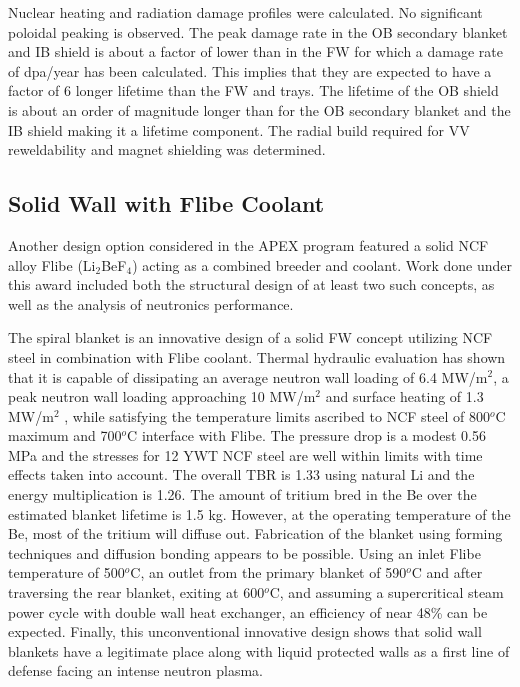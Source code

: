 Nuclear heating and radiation damage profiles were calculated. No significant
poloidal peaking is observed. The peak damage rate in the \gls{OB} secondary
blanket and \gls{IB} shield is about a factor of  lower than in
the \gls{FW} for which a damage rate of  dpa/year has been
calculated. This implies that they are expected to have a factor of 6 longer
lifetime than the \gls{FW} and trays. The lifetime of the \gls{OB} shield is
about an order of magnitude longer than for the \gls{OB} secondary blanket and
the \gls{IB} shield making it a lifetime component. The radial build required
for VV reweldability and magnet shielding was
determined.

\subsection{Solid Wall with Flibe Coolant}

Another design option considered in the \gls{APEX} program featured a solid
\gls{NCF} alloy Flibe (Li$_2$BeF$_4$) acting as a combined breeder and
coolant.  Work done under this award included both the structural design of at
least two such concepts, as well as the analysis of neutronics performance.

The spiral blanket is an innovative design of a solid \gls{FW} concept
utilizing \gls{NCF} steel in combination with Flibe coolant. Thermal hydraulic
evaluation has shown that it is capable of dissipating an average neutron wall
loading of 6.4 MW/m$^2$, a peak neutron wall loading approaching 10 MW/m$^2$
and surface heating of 1.3 MW/m$^2$ , while satisfying the temperature limits
ascribed to NCF steel of 800$^o$C maximum and 700$^o$C interface with
Flibe. The pressure drop is a modest 0.56 MPa and the stresses for 12 YWT
\gls{NCF} steel are well within limits with time effects taken into
account. The overall \gls{TBR} is 1.33 using natural Li and the energy
multiplication is 1.26. The amount of tritium bred in the Be over the
estimated blanket lifetime is 1.5 kg. However, at the operating temperature of
the Be, most of the tritium will diffuse out. Fabrication of the blanket using
forming techniques and diffusion bonding appears to be possible. Using an
inlet Flibe temperature of 500$^o$C, an outlet from the primary blanket of
590$^o$C and after traversing the rear blanket, exiting at 600$^o$C, and
assuming a supercritical steam power cycle with double wall heat exchanger, an
efficiency of near 48\% can be expected. Finally, this unconventional
innovative design shows that solid wall blankets have a legitimate place along
with liquid protected walls as a first line of defense facing an intense
neutron plasma.

